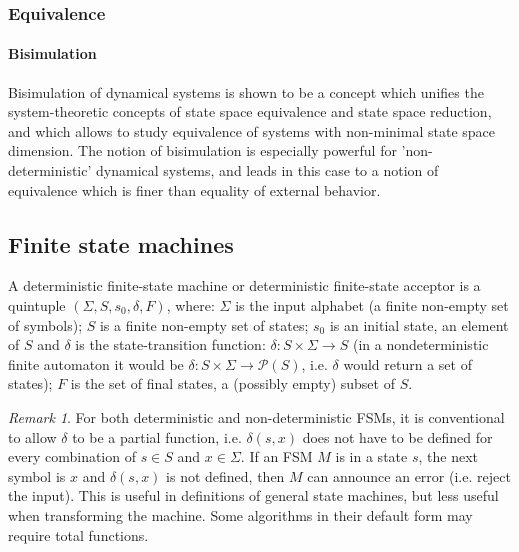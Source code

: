 \documentclass{scrartcl}
\theoremstyle{definition}
\theoremstyle{remark}
\newtheorem{remark}{Remark}
\begin{document}
\subsubsection{Equivalence}
\paragraph{Bisimulation}
Bisimulation of dynamical systems is shown to be a concept which unifies the system-theoretic concepts of state space
equivalence and state space reduction, and which allows to study equivalence of systems with non-minimal state space dimension. 
The notion of bisimulation is especially powerful for ’non-deterministic’ dynamical systems, and leads in this case to a notion of equivalence which is finer than equality of external behavior.

\citep{vanderschaft2004bisimulation}

\citep{vanderschaft2004equivalence}

\subsection{Finite state machines}

A deterministic finite-state machine or deterministic finite-state acceptor is a quintuple $(\Sigma ,S,s_{0},\delta,F)$, where: $\Sigma$  is the input alphabet (a finite non-empty set of symbols); $S$ is a finite non-empty set of states; $s_{0}$ is an initial state, an element of $S$ and $\delta$  is the state-transition function: 
$\delta :S\times \Sigma \rightarrow S$ (in a nondeterministic finite automaton it would be $\delta :S\times \Sigma \rightarrow {\mathcal {P}}(S)$, i.e. $\delta$  would return a set of states); $F$ is the set of final states, a (possibly empty) subset of $S$.


\begin{remark}
For both deterministic and non-deterministic FSMs, it is conventional to allow  $\delta$  to be a partial function, i.e. $\delta (s,x)$ does not have to be defined for every combination of $s\in S$ and $x\in \Sigma$. If an FSM $M$ is in a state $s$, the next symbol is $x$ and $\delta (s,x)$ is not defined, then $M$ can announce an error (i.e. reject the input). This is useful in definitions of general state machines, but less useful when transforming the machine. Some algorithms in their default form may require total functions.
\end{remark}
\end{document}
